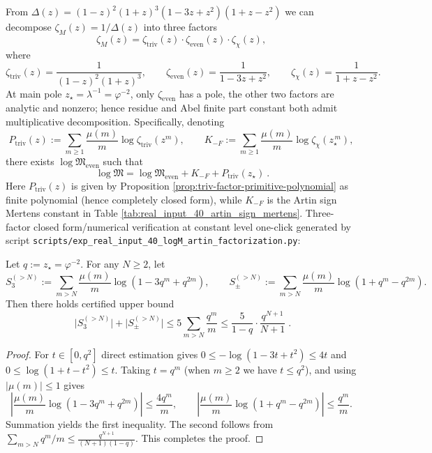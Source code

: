 \begin{remark}\label{rem:real-input-40-logM-artin-factorization}
From
\(
\Delta(z)=(1-z)^2(1+z)^3(1-3z+z^2)(1+z-z^2)
\)
we can decompose \(\zeta_M(z)=1/\Delta(z)\) into three factors
\[
\zeta_M(z)=\zeta_{\mathrm{triv}}(z)\cdot \zeta_{\mathrm{even}}(z)\cdot \zeta_{\chi}(z),
\]
where
\[
\zeta_{\mathrm{triv}}(z)=\frac{1}{(1-z)^2(1+z)^3},\qquad
\zeta_{\mathrm{even}}(z)=\frac{1}{1-3z+z^2},\qquad
\zeta_{\chi}(z)=\frac{1}{1+z-z^2}.
\]
At main pole \(z_\star=\lambda^{-1}=\varphi^{-2}\), only \(\zeta_{\mathrm{even}}\) has a pole, the other two factors are analytic and nonzero; hence residue and Abel finite part constant both admit multiplicative decomposition. Specifically, denoting
\[
P_{\mathrm{triv}}(z):=\sum_{m\ge 1}\frac{\mu(m)}{m}\log\zeta_{\mathrm{triv}}(z^m),\qquad
K_{-F}:=\sum_{m\ge 1}\frac{\mu(m)}{m}\log\zeta_{\chi}(z_\star^{\,m}),
\]
there exists \(\log\mathfrak{M}_{\mathrm{even}}\) such that
\[
\boxed{\ \log\mathfrak{M}=\log\mathfrak{M}_{\mathrm{even}}+K_{-F}+P_{\mathrm{triv}}(z_\star)\ }.
\]
Here \(P_{\mathrm{triv}}(z)\) is given by Proposition \ref{prop:triv-factor-primitive-polynomial} as finite polynomial (hence completely closed form), while \(K_{-F}\) is the Artin sign Mertens constant in Table \ref{tab:real_input_40_artin_sign_mertens}. Three-factor closed form/numerical verification at constant level one-click generated by script \texttt{scripts/exp\_real\_input\_40\_logM\_artin\_factorization.py}:

\end{remark}
\begin{corollary}\label{cor:real-input-40-mertens-two-series-tail}
Let \(q:=z_\star=\varphi^{-2}\).
For any \(N\ge 2\), let
\[
S_3^{(>N)}:=\sum_{m>N}\frac{\mu(m)}{m}\log(1-3q^m+q^{2m}),
\qquad
S_\pm^{(>N)}:=\sum_{m>N}\frac{\mu(m)}{m}\log(1+q^m-q^{2m}).
\]
Then there holds certified upper bound
\[
\boxed{\;
\bigl|S_3^{(>N)}\bigr|+\bigl|S_\pm^{(>N)}\bigr|
\le
5\sum_{m>N}\frac{q^m}{m}
\le
\frac{5}{1-q}\cdot\frac{q^{N+1}}{N+1}\; }.
\]
\end{corollary}
\begin{proof}
For \(t\in[0,q^2]\) direct estimation gives
\(
0\le -\log(1-3t+t^2)\le 4t
\)
and
\(
0\le \log(1+t-t^2)\le t
\).
Taking \(t=q^m\) (when \(m\ge 2\) we have \(t\le q^2\)), and using \(|\mu(m)|\le 1\) gives
\[
\left|\frac{\mu(m)}{m}\log(1-3q^m+q^{2m})\right|\le \frac{4q^m}{m},\qquad
\left|\frac{\mu(m)}{m}\log(1+q^m-q^{2m})\right|\le \frac{q^m}{m}.
\]
Summation yields the first inequality. The second follows from
\(
\sum_{m>N}q^m/m\le \frac{q^{N+1}}{(N+1)(1-q)}
\). This completes the proof.
\end{proof}
